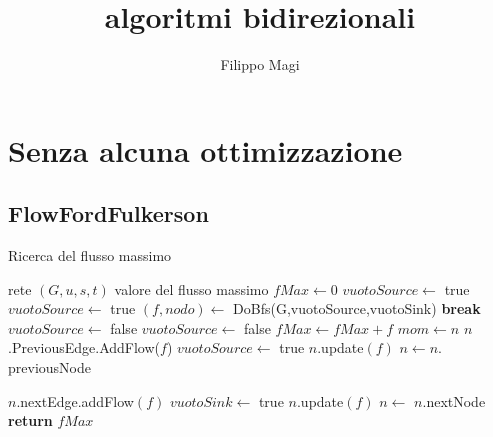 \documentclass{article}
\title{algoritmi bidirezionali}
\author{Filippo Magi }
\begin{document}
\maketitle
\section{Senza alcuna ottimizzazione}
\subsection{FlowFordFulkerson}
\begin{algorithm}
\caption{Ricerca del flusso massimo}
\begin{algorithmic}[1]
\REQUIRE rete $(G,u,s,t)$
\ENSURE valore del flusso massimo 
\STATE $fMax \leftarrow 0$
\STATE$ vuotoSource \leftarrow$ true
\STATE $vuotoSource \leftarrow$ true
\STATE $(f, nodo) \leftarrow$ DoBfs(G,vuotoSource,vuotoSink)
\STATE \textbf{break}
\ENDIF
\STATE $vuotoSource \leftarrow$ false
\STATE $vuotoSource \leftarrow$ false
\STATE $fMax \leftarrow fMax + f$
\STATE $mom \leftarrow n$
\STATE $n$.PreviousEdge.AddFlow($f$)
\STATE $vuotoSource \leftarrow$ true
\ENDIF
\STATE $n.$update$(f)$ 
\STATE $n \leftarrow n.$previousNode
\ENDWHILE
{}

\STATE $n.$nextEdge.addFlow$(f)$
\STATE $vuotoSink \leftarrow$ true
\ENDIF
\STATE $n.$update$(f)$ 
\STATE $n \leftarrow$ $n.$nextNode
\ENDWHILE
\ENDWHILE
\STATE \textbf{return} $fMax$
\end{algorithmic}
\end{algorithm}
\end{document}
